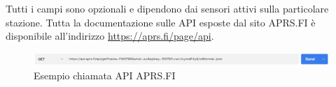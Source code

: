 Tutti i campi sono opzionali e dipendono dai sensori attivi sulla particolare stazione. Tutta la documentazione sulle API esposte dal sito APRS.FI è disponibile all'indirizzo \url{https://aprs.fi/page/api}.

\begin{figure}[h!]
	\centering
	\includegraphics[width=1\linewidth]{./Iterazione 3/ImageFiles/APIAPRSRequest}
	
	\caption{Esempio chiamata API APRS.FI}
	\label{fig:APIAPRS}
\end{figure}



